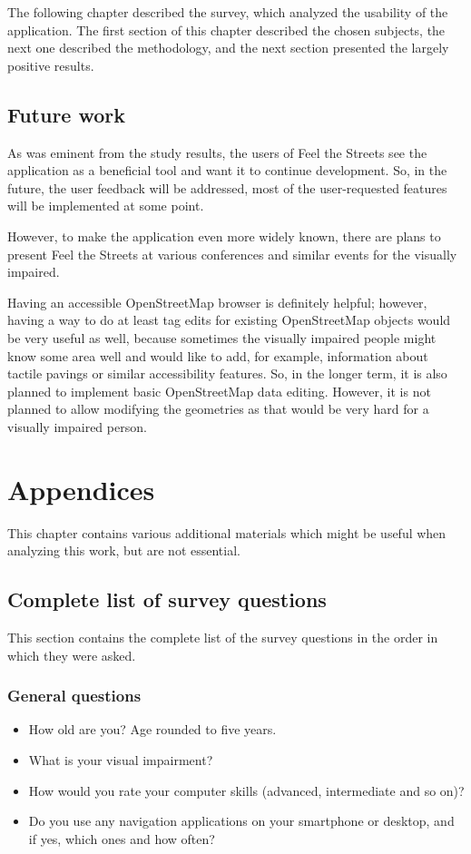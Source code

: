 \documentclass[nolof,digital]{fithesis3}
\begin{document}
The following chapter described the survey, which analyzed the usability of the application. The first section of this chapter described the chosen subjects, the next one described the methodology, and the next section presented the largely positive results.
\section{Future work}
As was eminent from the study results, the users of Feel the Streets see the application as a beneficial tool and want it to continue development. So, in the future, the user feedback will be addressed, most of the user-requested features will be implemented at some point.

However, to make the application even more widely known, there are plans to present Feel the Streets at various conferences and similar events for the visually impaired.

Having an accessible OpenStreetMap browser is definitely helpful; however, having a way to do at least tag edits for existing OpenStreetMap objects would be very useful as well, because sometimes the visually impaired people might know some area well and would like to add, for example, information about tactile pavings or similar accessibility features. So, in the longer term, it is also planned to implement basic OpenStreetMap data editing. However, it is not planned to allow modifying the geometries as that would be very hard for a visually impaired person.
\printbibliography
\appendix
\chapter{Appendices}
This chapter contains various additional materials which might be useful when analyzing this work, but are not essential.
\section{Complete list of survey questions}
This section contains the complete list of the survey questions in the order in which they were asked.
\subsection{General questions}
\begin{itemize}
\item How old are you? Age rounded to five years.
\item What is your visual impairment?
\item How would you rate your computer skills (advanced, intermediate and so on)?
\item Do you use any navigation applications on your smartphone or desktop, and if yes, which ones and how often?
\end{itemize}
\end{document}
